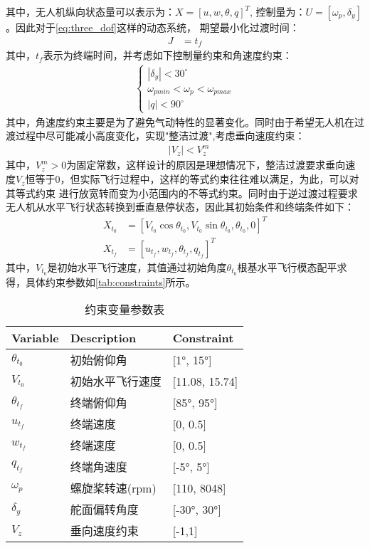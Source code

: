 其中，无人机纵向状态量可以表示为：$X=\left [ u,w,\theta,q \right ]^{T}$, 控制量为：$U=[\omega _{p},\delta_{y}]$。因此对于\autoref{eq:three_dof}这样的动态系统，
期望最小化过渡时间：
\begin{align}
    J & = t_{f}
\end{align}
其中，$t_{f}$表示为终端时间，并考虑如下控制量约束和角速度约束：
\begin{align}
    \left\{\begin{matrix}
      \left | \delta _{y} \right |<30^{\circ}\\
        \omega _{pmin}<\omega _{p}<\omega _{pmax}\\
        \left | q \right |<90^{\circ}
    \end{matrix}\right.
\end{align}
其中，角速度约束主要是为了避免气动特性的显著变化。同时由于希望无人机在过渡过程中尽可能减小高度变化，实现"整洁过渡"\cite{cheng2022transition},考虑垂向速度约束：
\begin{align}
    &\left | V_{z} \right |<V_{z}^{m}
\end{align}
其中，$V_{z}^{m}>0$为固定常数，这样设计的原因是理想情况下，整洁过渡要求垂向速度$V_{z}$恒等于0，但实际飞行过程中，这样的等式约束往往难以满足，为此，可以对其等式约束
进行放宽转而变为小范围内的不等式约束。同时由于逆过渡过程要求无人机从水平飞行状态转换到垂直悬停状态，因此其初始条件和终端条件如下：
\begin{align}
    X_{t_{0}} &=\left [ V_{t_{0}}\cos \theta_{t_{0}},V_{t_{0}}\sin \theta_{t_{0}},\theta_{t_{0}},0 \right]^{T}\\
    X_{t_{f}} &=\left [ u_{t_{f}},w_{t_{f}},\theta_{t_{f}},q_{t_{f}}\right]^{T}
\end{align}
其中，$V_{t_{0}}$是初始水平飞行速度，其值通过初始角度$\theta_{t_{0}}$根基水平飞行模态配平求得，具体约束参数如\autoref{tab:constraints}所示。
\begin{table}[htbp]
    \caption{约束变量参数表}
    \label{tab:constraints}
    \begin{tabularx}{\linewidth}{@{}llX@{}}
        \toprule
        Variable & Description & Constraint \\
        \midrule
        \( \theta_{t_{0}} \) & 初始俯仰角 & [1°, 15°] \\
        \( V_{t_{0}} \) & 初始水平飞行速度 & [11.08, 15.74] \\
        \( \theta_{t_{f}} \) & 终端俯仰角 & [85°, 95°] \\
        \( u_{t_{f}} \) & 终端速度 & [0, 0.5] \\
        \( w_{t_{f}} \) & 终端速度 & [0, 0.5] \\
        \( q_{t_{f}} \) & 终端角速度 & [-5°, 5°] \\
        \( \omega _{p} \) & 螺旋桨转速(rpm) & [110, 8048] \\
        \( \delta _{y} \) & 舵面偏转角度 & [-30°, 30°] \\
        \( V_{z} \) & 垂向速度约束 & [-1,1] \\
        \bottomrule
    \end{tabularx}
\end{table}
